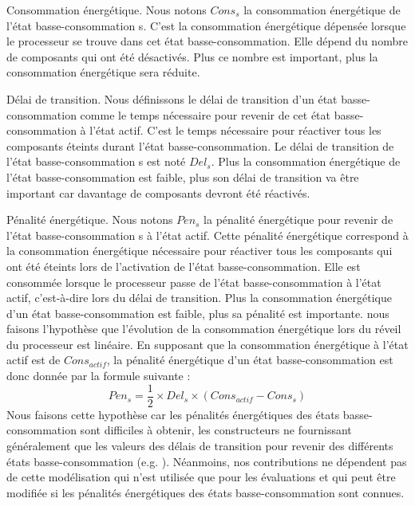 Consommation énergétique. Nous notons $Cons_s$ la consommation énergétique de l’état basse-consommation s. C’est la consommation énergétique dépensée lorsque le processeur 
se trouve dans cet état basse-consommation. 
Elle dépend du nombre de composants qui ont été désactivés. 
Plus ce nombre est important, plus la consommation énergétique sera réduite.

Délai de transition. Nous définissons le délai de transition d’un état basse-consommation comme le temps nécessaire pour revenir de cet état basse-consommation à l’état actif.
 C’est le temps nécessaire pour réactiver tous les composants éteints durant l’état basse-consommation. 
 Le délai de transition de l’état basse-consommation s est noté $Del_s$. 
 Plus la consommation énergétique de l’état basse-consommation est faible, 
 plus son délai de transition va être important car davantage de composants devront été réactivés.

Pénalité énergétique. Nous notons $Pen_s$ la pénalité énergétique pour revenir de l’état basse-consommation s à l’état actif.
Cette pénalité énergétique correspond à la consommation énergétique nécessaire pour réactiver tous les composants qui ont été 
éteints lors de l’activation de l’état basse-consommation. Elle est consommée lorsque le processeur passe de l’état basse-consommation à l’état actif, 
c’est-à-dire lors du délai de transition. Plus la consommation énergétique d’un état basse-consommation est faible, plus sa pénalité est importante.
nous faisons l’hypothèse que l’évolution de la consommation énergétique lors du réveil du processeur est linéaire. En supposant que la consommation énergétique à l’état actif est de $Cons_{actif}$,
la pénalité énergétique d’un état basse-consommation est donc donnée par la formule suivante :
\begin{equation}
Pen_s = \frac{1}{2} \times Del_s \times (Cons_{actif} - Cons_s)
\end{equation}
Nous faisons cette hypothèse car les pénalités énergétiques des états basse-consommation sont diﬃciles à obtenir, 
les constructeurs ne fournissant généralement que les valeurs des délais de transition pour revenir des diﬀérents états basse-consommation 
(e.g. \cite{STM, MPC}). Néanmoins, nos contributions ne dépendent pas de cette modélisation qui n’est utilisée que pour les évaluations et qui 
peut être modifiée si les pénalités énergétiques des états basse-consommation sont connues.

